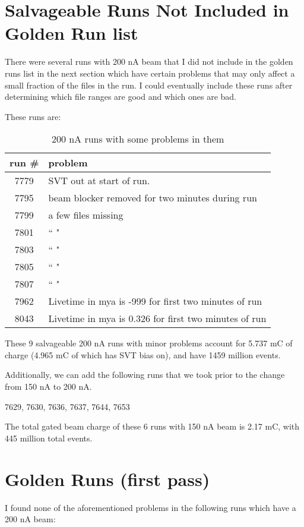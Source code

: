 \documentclass[11pt]{article}
\begin{document}
\section{Salvageable Runs Not Included in Golden Run list}
There were several runs with 200 nA beam that I did not include in the golden runs list in the next section which have certain problems that may only affect a small fraction of the files in the run.  I could eventually include these runs after determining which file ranges are good and which ones are bad. 

These runs are:

\begin{table}[htp]
\caption{200 nA runs with some problems in them}
\begin{center}
\begin{tabular}{|c|l|}
run \# & problem \\
\hline
7779 & SVT out at start of run.  \\
7795 & beam blocker removed for two minutes during run \\
7799 & a few files missing \\
7801 & ``      " \\
7803 & ``      " \\
7805 & ``      " \\
7807 & ``      " \\
7962 & Livetime in mya is -999 for first two minutes of run \\
8043 & Livetime in mya is 0.326 for first two minutes of run \\

\end{tabular}
\end{center}
\label{tab:salvageable}
\end{table}%



These 9 salvageable 200 nA runs with minor problems account for 5.737 mC of charge (4.965 mC of which has SVT bias on), and have 1459 million events.  

Additionally, we can add the following runs that we took prior to the change from 150 nA to 200 nA.  

7629, 7630, 7636, 7637, 7644, 7653

The total gated beam charge of these 6  runs with 150 nA beam is 2.17 mC, with 445 million total events.  





\section{Golden Runs (first pass)}
I found none of the aforementioned problems in the following runs which have a 200 nA beam:
\end{document}
